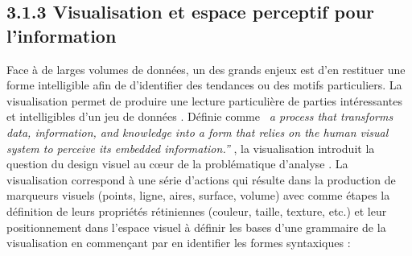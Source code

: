 \subsection[Visualisation et espace perceptif pour l{\textquoteright}information]{3.1.3 Visualisation et espace perceptif pour l{\textquoteright}information}
Face \`a de larges volumes de donn\'ees, un des grands enjeux est
d{\textquoteright}en restituer une forme intelligible afin de
d{\textquoteright}identifier des tendances ou des motifs particuliers.
La visualisation permet de produire une lecture particuli\`ere de
parties int\'eressantes et intelligibles d{\textquoteright}un jeu de
donn\'ees \citep{Cairo2013}. D\'efinie comme \textit{{\guillemotleft}~a
process that transforms data, information, and knowledge into a form
that relies on the human visual system to perceive its embedded
information.{\textquotedblright}} \citep{Graffieti2010}, la
visualisation introduit la question du design visuel au c{\oe}ur de la
probl\'ematique d{\textquoteright}analyse \citep{Wesolowsky1992}.
La visualisation correspond \`a une s\'erie d{\textquoteright}actions
qui r\'esulte dans la production de marqueurs visuels (points, ligne,
aires, surface, volume) avec comme \'etapes la d\'efinition de leurs
propri\'et\'es r\'etiniennes (couleur, taille, texture, etc.) et leur
positionnement dans l{\textquoteright}espace visuel \citep{Card Mackinlay}
 \`a d\'efinir les bases d{\textquoteright}une grammaire de la
visualisation en commen\c{c}ant par en identifier les formes
syntaxiques : 

